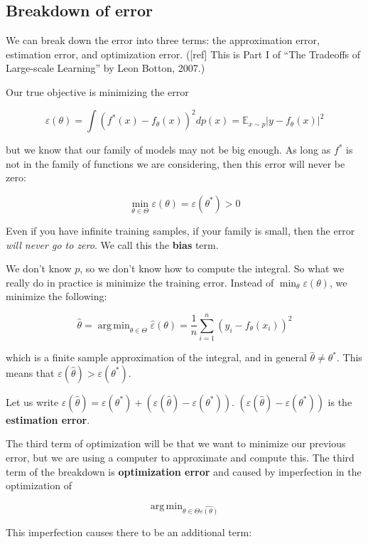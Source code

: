 \documentclass[12pt]{article}
\theoremstyle{plain}
\DeclareMathOperator*{\argmin}{arg\,min}
\begin{document}
\subsection*{Breakdown of error}

We can break down the error into three terms: the approximation error, estimation error, and optimization error. ([ref] This is Part I of ``The Tradeoffs of Large-scale Learning'' by Leon Botton, 2007.)

Our true objective is minimizing the error

$$ \varepsilon(\theta) = \int (f^*(x) - f_\theta(x))^2 d p(x)  = \mathbb{E}_{x \sim p} |y-f_\theta(x)|^2$$

but we know that our family of models may not be big enough. As long as $f^*$ is not in the family of functions we are considering, then this error will never be zero:

$$ \min_{\theta \in \Theta} \varepsilon(\theta) = \varepsilon(\theta^*) > 0 $$

Even if you have infinite training samples, if your family is small, then the error \textit{will never go to zero}. We call this the \textbf{bias} term.

We don't know $p$, so we don't know how to compute the integral. So what we really do in practice is minimize the training error. Instead of $\min_\theta \varepsilon(\theta)$, we minimize the following:

$$ \hat{\theta} = \argmin_{\theta \in \Theta} \hat{\varepsilon} (\theta ) = \frac{1}{n} \sum_{i=1}^n (y_i - f_\theta(x_i))^2 $$

which is a finite sample approximation of the integral, and in general $\hat{\theta} \neq \theta^*$. This means that $\varepsilon(\hat{\theta}) > \varepsilon(\theta^*)$.

Let us write $\varepsilon(\hat{\theta}) = \varepsilon(\theta^*) + (\varepsilon(\hat{\theta}) - \varepsilon(\theta^*))$. $(\varepsilon(\hat{\theta}) - \varepsilon(\theta^*))$ is the \textbf{estimation error}.

The third term of optimization will be that we want to minimize our previous error, but we are using a computer to approximate and compute this. The third term of the breakdown is \textbf{optimization error} and caused by imperfection in the optimization of

$$ \argmin_{\theta \in \Theta \hat{\varepsilon(\theta)}} $$

This imperfection causes there to be an additional term:
\end{document}
